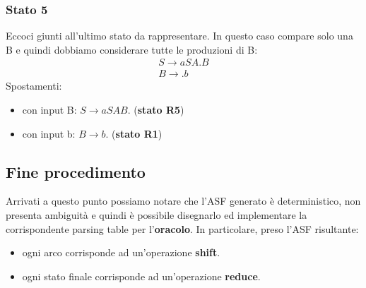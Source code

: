 \documentclass[a4paper, fleqn]{report}
\begin{document}
\subsubsection{Stato 5}
Eccoci giunti all'ultimo stato da rappresentare. In questo caso compare solo una B e quindi dobbiamo considerare tutte le produzioni di B:
\begin{gather*}
S \rightarrow aSA.B \\
B \rightarrow .b
\end{gather*}
Spostamenti:
\begin{itemize}
\item con input B: \(S \rightarrow aSAB.\) (\textbf{stato R5})
\item con input b: \(B \rightarrow b.\) (\textbf{stato R1})
\end{itemize}

\subsection{Fine procedimento}
Arrivati a questo punto possiamo notare che l'ASF generato è deterministico, non presenta ambiguità e quindi è possibile disegnarlo ed implementare la corrispondente parsing table per l'\textbf{oracolo}. In particolare, preso l'ASF risultante:
\begin{itemize}
\item ogni arco corrisponde ad un'operazione \textbf{shift}.
\item ogni stato finale corrisponde ad un'operazione \textbf{reduce}.
\end{itemize}
\end{document}
